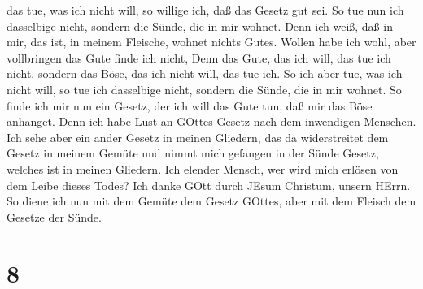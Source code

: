 das tue, was ich nicht will, so willige ich, daß das Gesetz gut sei.
 So tue nun ich dasselbige nicht, sondern die Sünde, die in
mir wohnet.  Denn ich weiß, daß in mir, das ist, in meinem
Fleische, wohnet nichts Gutes. Wollen habe ich wohl, aber vollbringen
das Gute finde ich nicht,  Denn das Gute, das ich will, das
tue ich nicht, sondern das Böse, das ich nicht will, das tue ich.
 So ich aber tue, was ich nicht will, so tue ich dasselbige
nicht, sondern die Sünde, die in mir wohnet.  So finde ich
mir nun ein Gesetz, der ich will das Gute tun, daß mir das Böse
anhanget.  Denn ich habe Lust an GOttes Gesetz nach dem
inwendigen Menschen.  Ich sehe aber ein ander Gesetz in
meinen Gliedern, das da widerstreitet dem Gesetz in meinem Gemüte und
nimmt mich gefangen in der Sünde Gesetz, welches ist in meinen Gliedern.
 Ich elender Mensch, wer wird mich erlösen von dem Leibe
dieses Todes?  Ich danke GOtt durch JEsum Christum, unsern
HErrn. So diene ich nun mit dem Gemüte dem Gesetz GOttes, aber mit dem
Fleisch dem Gesetze der Sünde.

\hypertarget{section-7}{%
\section{8}\label{section-7}}

